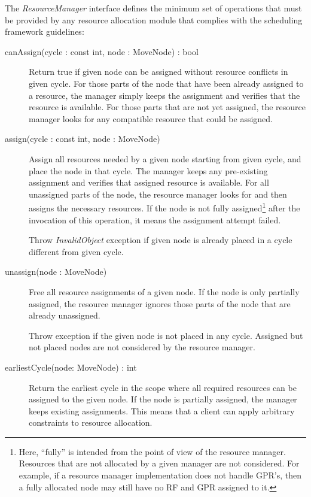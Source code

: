 \documentclass[a4paper,twoside]{tce}
\begin{document}
The \emph{ResourceManager} interface defines the minimum set of operations
that must be provided by any resource allocation module that complies with
the scheduling framework guidelines:
%
\begin{description}
\item[canAssign(cycle : const int, node : MoveNode) : bool]%
  Return true if given node can be assigned without resource conflicts in
  given cycle. For those parts of the node that have been already assigned
  to a resource, the manager simply keeps the assignment and verifies that
  the resource is available. For those parts that are not yet assigned, the
  resource manager looks for any compatible resource that could be assigned.

\item[assign(cycle : const int, node : MoveNode)]%
  Assign all resources needed by a given node starting from given cycle, and
  place the node in that cycle. The manager keeps any pre-existing
  assignment and verifies that assigned resource is available. For all
  unassigned parts of the node, the resource manager looks for and then
  assigns the necessary resources. If the node is not fully
  assigned\footnote{
%
    Here, ``fully'' is intended from the point of view of the resource
    manager. Resources that are not allocated by a given manager are not
    considered. For example, if a resource manager implementation does not
    handle GPR's, then a fully allocated node may still have no RF and GPR
    assigned to it.}
%
  after the invocation of this operation, it means the assignment attempt
  failed.

  Throw \emph{InvalidObject} exception if given node is already placed in a
  cycle different from given cycle.

\item[unassign(node : MoveNode)]%
  Free all resource assignments of a given node. If the node is only
  partially assigned, the resource manager ignores those parts of the node
  that are already unassigned.
%

  Throw exception if the given node is not placed in any cycle. Assigned but
  not placed nodes are not considered by the resource manager.

\item[earliestCycle(node: MoveNode) : int]%
  Return the earliest cycle in the scope where all required resources can be
  assigned to the given node. If the node is partially assigned, the manager
  keeps existing assignments. This means that a client can apply arbitrary
  constraints to resource allocation.


\end{description}
\end{document}
